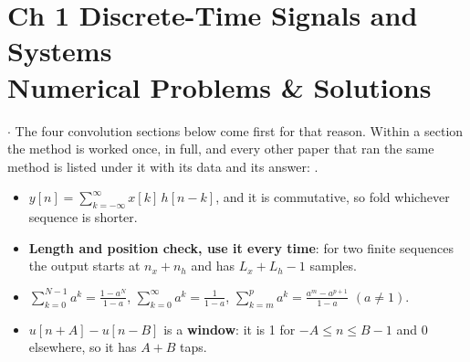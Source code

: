 \section*{\color{acc}Ch 1 \textperiodcentered{} Discrete-Time Signals and Systems\\[2pt]
{\large\textcolor{sub}{Numerical Problems \& Solutions}}}
\vspace{-4pt}{\color{acc}\rule{\textwidth}{1.1pt}}\vspace{4pt}

{\color{sub}\footnotesize {} \gap$\cdot$\gap {} The four convolution
sections below come first for that reason. Within a section the method is worked once, in
full, and every other paper that ran the same method is listed under it with its data and its
answer: .}

\begin{itemize}
  \item $y[n]=\displaystyle\sum_{k=-\infty}^{\infty}x[k]\,h[n-k]$, and it is commutative, so
        fold whichever sequence is shorter.
  \item \textbf{Length and position check, use it every time}: for two finite sequences the
        output starts at $n_x+n_h$ and has $L_x+L_h-1$ samples.
  \item $\displaystyle\sum_{k=0}^{N-1}a^k=\frac{1-a^N}{1-a}$, \quad
        $\displaystyle\sum_{k=0}^{\infty}a^k=\frac{1}{1-a}$, \quad
        $\displaystyle\sum_{k=m}^{p}a^k=\frac{a^m-a^{p+1}}{1-a}$ \; $(a\ne1)$.
  \item $u[n+A]-u[n-B]$ is a \textbf{window}: it is 1 for $-A\le n\le B-1$ and 0 elsewhere,
        so it has $A+B$ taps. 
\end{itemize}

\hr

